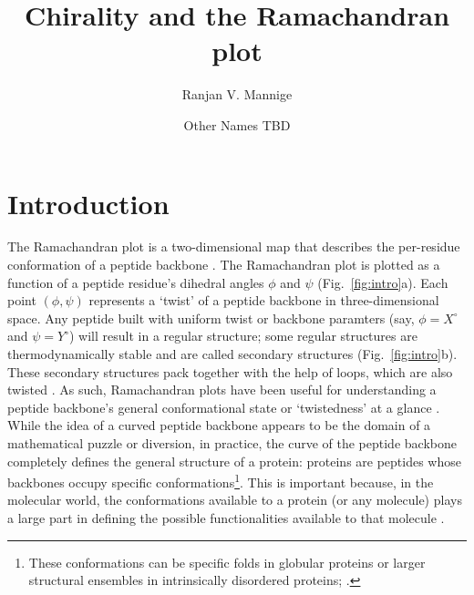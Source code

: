 \documentclass[fleqn,10pt]{wlpeerj} %
\title{Chirality and the Ramachandran plot}
\author[1,*]{Ranjan V. Mannige}
\author[1]{Other Names TBD}
\affil[1]{~Molecular Foundry, Lawrence Berkeley National Laboratory, 1 Cyclotron Road, Berkeley, CA, U.S.A.}
\affil[*]{~rvmannige@lbl.gov}
\newcommand{\Fig}[1]{Fig.~\ref{#1}}
\begin{document}
\flushbottom
\maketitle
\thispagestyle{empty}

\section*{Introduction}


The Ramachandran plot \citep{Ramachandran1963} is a two-dimensional map that describes the per-residue conformation of a peptide backbone \citep{Berg2006,Alberts2002}. The Ramachandran plot is plotted as a function of a peptide residue's dihedral angles $\phi$ and $\psi$ (\Fig{fig:intro}a). Each point $(\phi,\psi)$ represents a `twist' of a peptide backbone in three-dimensional space. Any peptide built with uniform twist or backbone paramters (say, $\phi=X^\circ$ and $\psi=Y^\circ$) will result in a regular structure; some regular structures are thermodynamically stable and are called secondary structures (\Fig{fig:intro}b). These secondary structures pack together with the help of loops, which are also twisted \cite{Berg2006}. As such, Ramachandran plots have been useful for understanding a peptide backbone's general conformational state or `twistedness' at a glance \citep{Berg2006,Alberts2002,Subramanian2001,Laskowski1993,Hooft1997,Laskowski2003}. While the idea of a curved peptide backbone appears to be the domain of a mathematical puzzle or diversion, in practice, the curve of the peptide backbone completely defines the general structure of a protein: proteins are peptides whose backbones occupy specific conformations\footnote{These conformations can be specific folds in globular proteins or larger structural ensembles in intrinsically disordered proteins; \cite{Mannige2014b}.}. This is important because, in the molecular world, the conformations available to a protein (or any molecule) plays a large part in defining the possible functionalities available to that molecule \citep{Berg2006,Alberts2002}.
\end{document}
